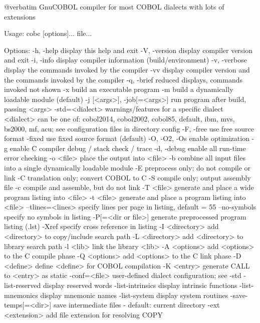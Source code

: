 @verbatim
GnuCOBOL compiler for most COBOL dialects with lots of extensions

Usage: cobc [options]... file...

Options:
  -h, -help             display this help and exit
  -V, -version          display compiler version and exit
  -i, -info             display compiler information (build/environment)
  -v, -verbose          display the commands invoked by the compiler
  -vv                   display compiler version and the commands
                        invoked by the compiler
  -q, -brief            reduced displays, commands invoked not shown
  -x                    build an executable program
  -m                    build a dynamically loadable module (default)
  -j [<args>], -job[=<args>]	run program after build, passing <args>
  -std=<dialect>        warnings/features for a specific dialect
                        <dialect> can be one of:
                        cobol2014, cobol2002, cobol85, default,
                        ibm, mvs, bs2000, mf, acu;
                        see configuration files in directory config
  -F, -free             use free source format
  -fixed                use fixed source format (default)
  -O, -O2, -Os          enable optimization
  -g                    enable C compiler debug / stack check / trace
  -d, -debug            enable all run-time error checking
  -o <file>             place the output into <file>
  -b                    combine all input files into a single
                        dynamically loadable module
  -E                    preprocess only; do not compile or link
  -C                    translation only; convert COBOL to C
  -S                    compile only; output assembly file
  -c                    compile and assemble, but do not link
  -T <file>             generate and place a wide program listing into <file>
  -t <file>             generate and place a program listing into <file>
  --tlines=<lines>      specify lines per page in listing, default = 55
  --no-symbols          specify no symbols in listing
  -P[=<dir or file>]    generate preprocessed program listing (.lst)
  -Xref                 specify cross reference in listing
  -I <directory>        add <directory> to copy/include search path
  -L <directory>        add <directory> to library search path
  -l <lib>              link the library <lib>
  -A <options>          add <options> to the C compile phase
  -Q <options>          add <options> to the C link phase
  -D <define>           define <define> for COBOL compilation
  -K <entry>            generate CALL to <entry> as static
  -conf=<file>          user-defined dialect configuration; see -std
  -list-reserved        display reserved words
  -list-intrinsics      display intrinsic functions
  -list-mnemonics       display mnemonic names
  -list-system          display system routines
  -save-temps[=<dir>]   save intermediate files
                        - default: current directory
  -ext <extension>      add file extension for resolving COPY


